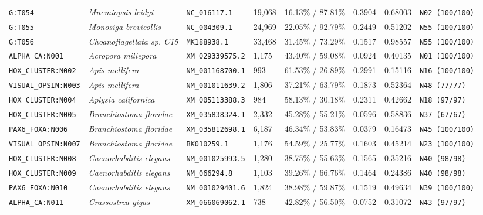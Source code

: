 \documentclass[10pt,letterpaper]{article}
\begin{document}
\begin{longtable}{llllllll}
\texttt{G:T054} & \textit{Mnemiopsis leidyi} & \texttt{NC\_016117.1} & 19,068 & 16.13\% / 87.81\% & 0.3904 & 0.68003 & \texttt{N02 (100/100)} \\
\texttt{G:T055} & \textit{Monosiga brevicollis} & \texttt{NC\_004309.1} & 24,969 & 22.05\% / 92.79\% & 0.2449 & 0.51202 & \texttt{N55 (100/100)} \\
\texttt{G:T056} & \textit{Choanoflagellata sp. C15} & \texttt{MK188938.1} & 33,468 & 31.45\% / 73.29\% & 0.1517 & 0.98557 & \texttt{N55 (100/100)} \\
\texttt{ALPHA\_CA:N001} & \textit{Acropora millepora} & \texttt{XM\_029339575.2} & 1,175 & 43.40\% / 59.08\% & 0.0924 & 0.40135 & \texttt{N01 (100/100)} \\
\texttt{HOX\_CLUSTER:N002} & \textit{Apis mellifera} & \texttt{NM\_001168700.1} & 993 & 61.53\% / 26.89\% & 0.2991 & 0.15116 & \texttt{N16 (100/100)} \\
\texttt{VISUAL\_OPSIN:N003} & \textit{Apis mellifera} & \texttt{NM\_001011639.2} & 1,806 & 37.21\% / 63.79\% & 0.1873 & 0.52364 & \texttt{N48 (77/77)} \\
\texttt{HOX\_CLUSTER:N004} & \textit{Aplysia californica} & \texttt{XM\_005113388.3} & 984 & 58.13\% / 30.18\% & 0.2311 & 0.42662 & \texttt{N18 (97/97)} \\
\texttt{HOX\_CLUSTER:N005} & \textit{Branchiostoma floridae} & \texttt{XM\_035838324.1} & 2,332 & 45.28\% / 55.21\% & 0.0596 & 0.58836 & \texttt{N37 (67/67)} \\
\texttt{PAX6\_FOXA:N006} & \textit{Branchiostoma floridae} & \texttt{XM\_035812698.1} & 6,187 & 46.34\% / 53.83\% & 0.0379 & 0.16473 & \texttt{N45 (100/100)} \\
\texttt{VISUAL\_OPSIN:N007} & \textit{Branchiostoma floridae} & \texttt{BK010259.1} & 1,176 & 54.59\% / 25.77\% & 0.1603 & 0.45214 & \texttt{N23 (100/100)} \\
\texttt{HOX\_CLUSTER:N008} & \textit{Caenorhabditis elegans} & \texttt{NM\_001025993.5} & 1,280 & 38.75\% / 55.63\% & 0.1565 & 0.35216 & \texttt{N40 (98/98)} \\
\texttt{HOX\_CLUSTER:N009} & \textit{Caenorhabditis elegans} & \texttt{NM\_066294.8} & 1,103 & 39.26\% / 66.76\% & 0.1464 & 0.24386 & \texttt{N40 (98/98)} \\
\texttt{PAX6\_FOXA:N010} & \textit{Caenorhabditis elegans} & \texttt{NM\_001029401.6} & 1,824 & 38.98\% / 59.87\% & 0.1519 & 0.49634 & \texttt{N39 (100/100)} \\
\texttt{ALPHA\_CA:N011} & \textit{Crassostrea gigas} & \texttt{XM\_066069062.1} & 738 & 42.82\% / 56.50\% & 0.0752 & 0.31072 & \texttt{N43 (97/97)} \\

\end{longtable}
\end{document}
